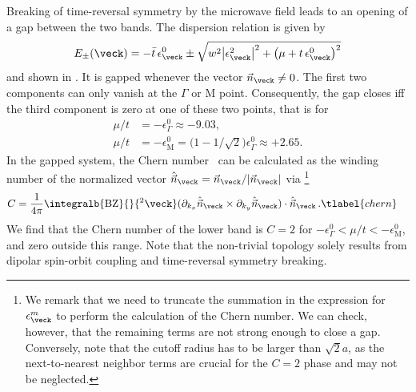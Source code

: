 Breaking of time-reversal symmetry by the microwave field leads to an opening of a gap between the two bands.
The dispersion relation is given by
\begin{align}
    E_\pm(\veck)=- \bar{t}\, \epsilon^0_\veck \pm \sqrt{w^2 \big|\epsilon^2_{\veck}\big|^2+\big(\mu+t\, \epsilon^0_{\veck}\big)^2}
\end{align}
and shown in .
It is gapped whenever the vector $\vec{n}_{\veck}\ne 0$.
The first two components can only vanish at the $\Gamma$ or $\text{M}$ point.
Consequently, the gap closes iff the third component is zero at one of these two points, that is for
\begin{align} %
    \mu/t &= -\epsilon^0_{\Gamma} \approx -9.03, \\
    \mu/t &= -\epsilon^0_\text{M} = \Big(1-1/\sqrt{2}\Big)\epsilon_{\Gamma}^0 \approx +2.65.
\end{align}
In the gapped system, the Chern number~\cite{Hasan2010,Qi2011} can be calculated as the winding number of the normalized vector $\hat{\vec{n}}_\veck = \vec{n}_\veck/|\vec{n}_\veck|$ via
\footnote{We remark that we need to truncate the summation in the expression for $\epsilon^m_{\veck}$ to perform the calculation of the Chern number.
We can check, however, that the remaining terms are not strong enough to close a gap.
Conversely, note that the cutoff radius has to be larger than $\sqrt{2}a$, as the next-to-nearest neighbor terms are crucial for the $C=2$ phase and may not be neglected.}
\begin{align}
    C &= \frac{1}{4\pi}\integralb{\text{BZ}}{}{^2\veck} ( \partial_{k_x} \hat{\vec{n}}_{\veck} \times \partial_{k_y} \hat{\vec{n}}_{\veck} ) \cdot \hat{\vec{n}}_{\veck} \, . \tlabel{chern}
\end{align}
We find that the Chern number of the lower band is $C=2$ for $-\epsilon^0_{\Gamma} < \mu/t < -\epsilon^0_\text{M}$, and zero outside this range.
Note that the non-trivial topology solely results from dipolar spin-orbit coupling and time-reversal symmetry breaking.

